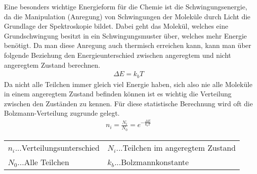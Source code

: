 Eine besonders wichtige Energieform für die Chemie ist die Schwingungsenergie, da die Manipulation (Anregung) von Schwingungen der Moleküle durch
Licht die Grundlage der Spektroskopie bildet. Dabei geht das Molekül, welches eine Grundschwingung besitzt in ein Schwingungsmuster über, welches 
mehr Energie benötigt. Da man diese Anregung auch thermisch erreichen kann, kann man über folgende Beziehung den Energieunterschied zwischen 
angeregtem und nicht angeregtem Zustand berechnen.
\begin{align}
    \Delta E = k_b T
\end{align}
Da nicht alle Teilchen immer gleich viel Energie haben, sich also nie alle Moleküle in einem angeregtem Zustand befinden können ist es wichtig
die Verteilung zwischen den Zuständen zu kennen. Für diese statistische Berechnung wird oft die Bolzmann-Verteilung zugrunde gelegt.
\begin{align}
    n_i = \frac{N_i}{N_0} = e^{-\frac{\Delta E}{k_b T}}
\end{align} 

\begin{table}[H]
    \centering
    \begin{tabular}{ll}
        $n_i$...Verteilungsunterschied & $N_i$...Teilchen im angeregtem Zustand \\
        $N_0$...Alle Teilchen & $k_b$...Bolzmannkonstante
    \end{tabular}
\end{table}